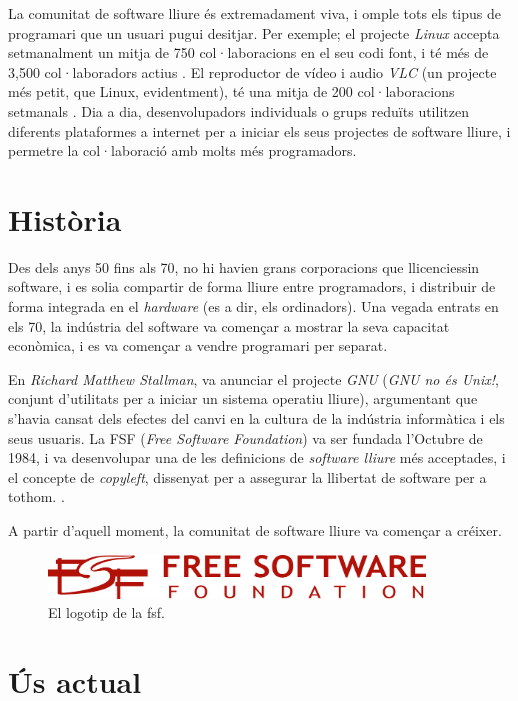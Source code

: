 La comunitat de software lliure és extremadament viva, i omple tots els tipus de programari que un usuari pugui desitjar. Per exemple; el projecte \emph{Linux} accepta setmanalment un mitja de 750 col·laboracions en el seu codi font, i té més de 3,500 col·laboradors actius \cite{linuxgitrepo}. El reproductor de vídeo i audio \emph{VLC} (un projecte més petit, que Linux, evidentment), té una mitja de 200 col·laboracions setmanals \cite{vlcgitrepo}. Dia a dia, desenvolupadors individuals o grups reduïts utilitzen diferents plataformes a internet per a iniciar els seus projectes de software lliure, i permetre la col·laboració amb molts més programadors.

\section{Història}

Des dels anys 50 fins als 70, no hi havien grans corporacions que 
llicenciessin software, i es solia compartir de forma lliure entre
programadors, i distribuir de forma integrada en el \emph{hardware}
(es a dir, els ordinadors). Una vegada entrats en els 70, la indústria del
software va començar a mostrar la seva capacitat econòmica, i es va
començar a vendre programari per separat. \cite{ibmusdata}

En \emph{Richard Matthew Stallman}, va anunciar el projecte \emph{GNU} (\emph{GNU no és Unix!}, conjunt d'utilitats per a iniciar un sistema operatiu lliure), argumentant que s'havia cansat dels efectes del canvi en la cultura de la indústria informàtica i els seus usuaris. La FSF (\emph{Free Software Foundation}) va ser fundada l'Octubre de 1984, i va desenvolupar una de les definicions de \emph{software lliure} més acceptades, i el concepte de \emph{copyleft}, dissenyat per a assegurar la llibertat de software per a tothom. \cite{fossieee}.

A partir d'aquell moment, la comunitat de software lliure va començar a créixer.

\begin{figure}[ht!]
\centering
\includegraphics[width=100mm]{data/fsf.png}
\caption{El logotip de la \ac{fsf}.}
\label{fsfpic}
\end{figure}

\section{Ús actual}

